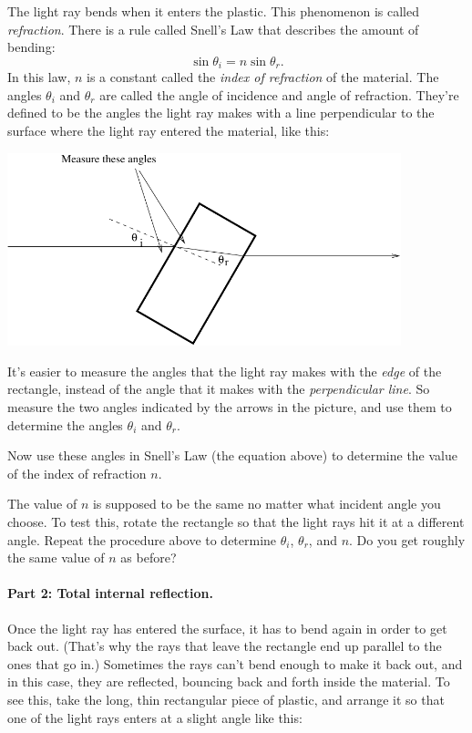 The light ray bends when it enters the plastic.  This phenomenon is
called {\it refraction}.  There is a rule called Snell's Law that
describes the amount of bending:
$$
\sin\theta_i=n\sin\theta_r.
$$
In this law, $n$ is a constant called the {\it index of refraction} of 
the material.  The angles $\theta_i$ and $\theta_r$ are called the
angle of incidence and angle of refraction.  They're defined to be the
angles the light ray makes with a line 
perpendicular to the surface
where the light ray entered the material, like this:

\answerspace{0.1in}
\centerline{\includegraphics[width=4.5in]{lenses1/lensfig3.pdf}}

It's easier to measure the angles that the light ray makes with
the \textit{edge} of the rectangle, instead of the angle that it makes with
the \textit{perpendicular line}.  So measure the two angles
indicated by the arrows in the picture, and use them
to determine the angles $\theta_i$ and $\theta_r$.

\answerspace{1.5in}

Now use these angles in Snell's Law (the equation above) to determine
the value of the index of refraction $n$.

\answerspace{1.5in}

The value of $n$ is supposed to be the same no matter what incident angle
you choose.  To test this, rotate the rectangle so that the light
rays hit it at a different angle.  Repeat the procedure above to determine
$\theta_i$, $\theta_r$, and $n$.  Do you get roughly the same value of $n$ as
before?

\answerspace{3.0in}

\paragraph{Part 2: Total internal reflection.}
Once the light ray has entered the surface, it has to bend again
in order to get back out.  (That's why the rays that leave the rectangle
end up parallel to the ones that go in.)  Sometimes the rays can't bend
enough to make it back out, and in this case, they are reflected, bouncing
back and forth inside the material.  To see this, take the long, thin
rectangular piece of plastic, and arrange it so that one of the light
rays enters at a slight angle like this:

